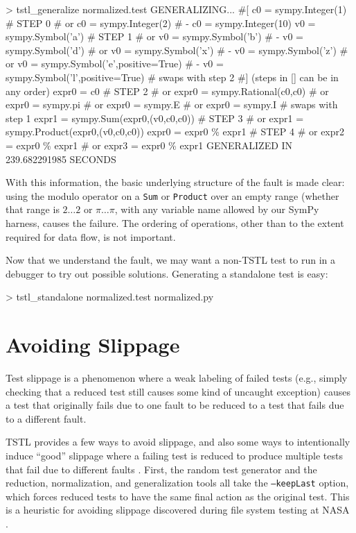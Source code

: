 {\scriptsize
\begin{code}
 > tstl\_generalize normalized.test
 GENERALIZING...
 \#[
 c0 = sympy.Integer(1)                               \# STEP 0
 \#  or c0 = sympy.Integer(2) 
 \#   - c0 = sympy.Integer(10) 
 v0 = sympy.Symbol('a')                              \# STEP 1
 \#  or v0 = sympy.Symbol('b') 
 \#   - v0 = sympy.Symbol('d') 
 \#  or v0 = sympy.Symbol('x') 
 \#   - v0 = sympy.Symbol('z') 
 \#  or v0 = sympy.Symbol('e',positive=True) 
 \#   - v0 = sympy.Symbol('l',positive=True) 
 \#  swaps with step 2
 \#] (steps in [] can be in any order)
 expr0 = c0                                          \# STEP 2
 \#  or expr0 = sympy.Rational(c0,c0) 
 \#  or expr0 = sympy.pi 
 \#  or expr0 = sympy.E 
 \#  or expr0 = sympy.I 
 \#  swaps with step 1
 expr1 = sympy.Sum(expr0,(v0,c0,c0))                 \# STEP 3
 \#  or expr1 = sympy.Product(expr0,(v0,c0,c0)) 
 expr0 = expr0 \% expr1                               \# STEP 4
 \#  or expr2 = expr0 \% expr1 
 \#  or expr3 = expr0 \% expr1 
 GENERALIZED IN 239.682291985 SECONDS
\end{code}
}

With this information, the basic underlying structure
of the fault is made clear:  using the modulo operator on a {\tt Sum}
or {\tt Product} over an empty range (whether that range is $2 \ldots 2$ or
$\pi \ldots \pi$, with any variable name allowed by our SymPy harness,
causes the failure.  The ordering of operations, other than to the
extent required for data flow, is not important.

Now that we understand the fault, we may want a non-TSTL test to run
in a debugger to try out possible solutions.  Generating a standalone
test is easy:

{\scriptsize
\begin{code}
 > tstl\_standalone normalized.test normalized.py
\end{code}
}

\section{Avoiding Slippage}

Test slippage \cite{PLDI13,slippage} is a phenomenon where a weak
labeling of failed tests (e.g., simply checking that a reduced test
still causes some kind of uncaught exception) causes a test that
originally fails due to one fault to be reduced to a test that fails
due to a different fault.

TSTL provides a few ways to avoid slippage, and also some ways to
intentionally induce ``good'' slippage where a failing test is reduced
to produce multiple tests that fail due to different faults
\cite{slippage}.  First, the random test generator and the reduction,
normalization, and generalization tools all take the {\tt --keepLast}
option, which forces reduced tests to have the same final action as
the original test.  This is a heuristic for avoiding slippage
discovered during file system testing at NASA \cite{ICSEDiff}.